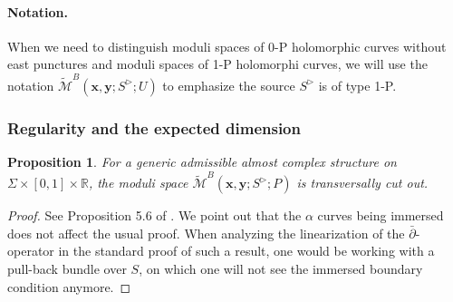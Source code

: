 \documentclass{amsart}
\newtheorem{prop}[thm]{Proposition}
\theoremstyle{definition}
\theoremstyle{remark}
\numberwithin{equation}{section}
\numberwithin{equation}{section} \makeatletter
\begin{document}
\paragraph*{\textbf{Notation.}} When we need to distinguish moduli spaces of 0-P holomorphic curves without east punctures and moduli spaces of 1-P holomorphi curves, we will use the notation $\widetilde{\mathcal{M}}^B(\bm{x},\bm{y};S^{\triangleright};U)$ to emphasize the source $S^\triangleright$ is of type 1-P. 

\subsubsection{Regularity and the expected dimension}
\begin{prop}\label{Proposition, regularity of the moduli spaces}
For a generic admissible almost complex structure on $\Sigma\times [0,1]\times \mathbb{R}$, the moduli space $\widetilde{\mathcal{M}}^B(\bm{x},\bm{y};S^{\triangleright};P)$ is transversally cut out.
\end{prop}
\begin{proof}
See Proposition 5.6 of \cite{LOT18}. We point out that the $\alpha$ curves being immersed does not affect the usual proof. When analyzing the linearization of the $\bar{\partial}$-operator in the standard proof of such a result, one would be working with a pull-back bundle over $S$, on which one will not see the immersed boundary condition anymore.   
\end{proof}
\end{document}
